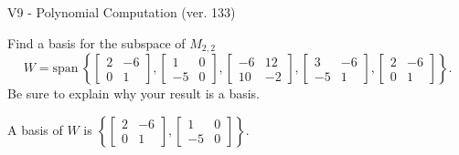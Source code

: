\begin{exercise}
  \begin{exerciseTitle}V9 - Polynomial Computation (ver. 133)\end{exerciseTitle}
  \begin{exerciseStatement}
    Find a basis for the subspace of \(M_{2,2}\) 
\[W=\mathrm{span}\ \left\{\left[\begin{array}{cc}
2 & -6 \\
0 & 1
\end{array}\right] , \left[\begin{array}{cc}
1 & 0 \\
-5 & 0
\end{array}\right] , \left[\begin{array}{cc}
-6 & 12 \\
10 & -2
\end{array}\right] , \left[\begin{array}{cc}
3 & -6 \\
-5 & 1
\end{array}\right] , \left[\begin{array}{cc}
2 & -6 \\
0 & 1
\end{array}\right]\right\}.\]
 Be sure to explain why your result is a basis.


  \end{exerciseStatement}
  \begin{exerciseAnswer}
   A basis of \(W\) is  \(\left\{\left[\begin{array}{cc}
2 & -6 \\
0 & 1
\end{array}\right] , \left[\begin{array}{cc}
1 & 0 \\
-5 & 0
\end{array}\right]\right\}\).
  


  \end{exerciseAnswer}
\end{exercise}